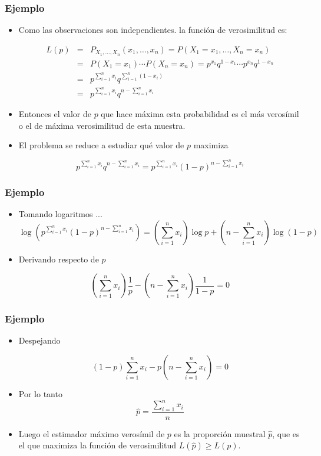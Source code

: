 \begin{frame}
\frametitle{Ejemplo}
\begin{itemize}
\item Como las observaciones son independientes. la función de verosimilitud es:

\begin{eqnarray*}
L(p)&=&P_{X_{1},\ldots,X_{n}}(x_{1},\ldots,x_{n})=
     P(X_{1}=x_{1},\ldots,X_{n}=x_{n})\\
 & =& 
P(X_{1}=x_{1})\cdots P(X_{n}=x_{n})= p^{x_{1}}q^{1-x_{1}}\cdots p^{x_{n}}q^{1-x_{n}}
\\
& =& p^{\sum_{i=1}^n x_{i}} q^{\sum_{i=1}^n (1-x_{i})}\\
&=& p^{\sum_{i=1}^n x_{i}} q^{n-\sum_{i=1}^n x_{i}}
\end{eqnarray*}

\item Entonces el valor de $p$ que hace máxima esta probabilidad es el más verosímil o el de
máxima verosimilitud de esta muestra.
\item El problema se reduce  a estudiar qué valor de $p$ maximiza

$$p^{\sum_{i=1}^n x_{i}} q^{n-\sum_{i=1}^n x_{i}}=p^{\sum_{i=1}^n x_{i}}
(1-p)^{n-\sum_{i=1}^n x_{i}}$$
\end{itemize}
\end{frame}

\begin{frame}
\frametitle{Ejemplo}
\begin{itemize}
\item Tomando logaritmos ...
$$\log\left(p^{\sum_{i=1}^n x_{i}} (1-p)^{n-\sum_{i=1}^n x_{i}}\right)=\left(\sum_{i=1}^n x_{i}\right)
\log p + \left(n -\sum_{i=1}^n x_{i}\right) \log(1-p)$$
\item Derivando respecto de $p$

$$\left(\sum_{i=1}^n x_{i}\right) \frac{1}{p} - \left(n -\sum_{i=1}^n x_{i}\right)\frac{1}{1-p}=0$$
\end{itemize}
\end{frame}

\begin{frame}
\frametitle{Ejemplo}
\begin{itemize}
\item Despejando

$$(1-p)\sum_{i=1}^n x_{i} -p \left(n-\sum_{i=1}^n x_{i}\right)=0$$

\item Por lo tanto $$\hat{p}=\frac{\sum_{i=1}^n x_{i}}{n}$$
\item Luego el estimador máximo verosímil de $p$ es la proporción muestral $\hat{p}$, que es el que
maximiza la función de verosimilitud $L(\hat{p})\geq L(p)$.
\end{itemize}

% 

\end{frame}
